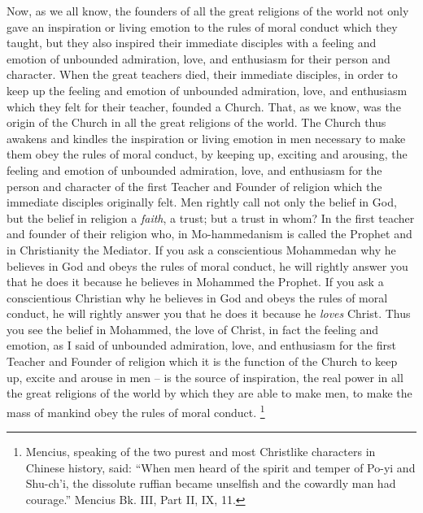 Now, as we all know, the founders of all the great religions of the world not only gave an inspiration or living emotion to the rules of moral conduct which they taught, but they also inspired their immediate disciples with a feeling and emotion of unbounded admiration, love, and enthusiasm for their person and character.
When the great teachers died, their immediate disciples, in order to keep up the feeling and emotion of unbounded admiration, love, and enthusiasm which they felt for their teacher, founded a Church.
That, as we know, was the origin of the Church in all the great religions of the world.
The Church thus awakens and kindles the inspiration or living emotion in men necessary to make them obey the rules of moral conduct, by keeping up, exciting and arousing, the feeling and emotion of unbounded admiration, love, and enthusiasm for the person and character of the first Teacher and Founder of religion which the immediate disciples originally felt.
Men rightly call not only the belief in God, but the belief in religion a \emph{faith}, a trust; but a trust in whom? In the first teacher and founder of their religion who, in Mo-hammedanism is called the Prophet and in Christianity the Mediator.
If you ask a conscientious Mohammedan why he believes in God and obeys the rules of moral conduct, he will rightly answer you that he does it because he believes in Mohammed the Prophet.
If you ask a conscientious Christian why he believes in God and obeys the rules of moral conduct, he will rightly answer you that he does it because he \emph{loves} Christ.
Thus you see the belief in Mohammed, the love of Christ, in fact the feeling and emotion,
as I said of unbounded admiration, love, and enthusiasm for the first Teacher and Founder of religion
which it is the function of the Church to keep up, excite and arouse in men
-- is the source of inspiration, the real power in all the great religions of the world by which they are able to make men, to make the mass of mankind obey the rules of moral conduct.
\footnote{Mencius, speaking of the two purest and most Christlike characters in Chinese history, said: ``When men heard of the spirit and temper of Po-yi and Shu-ch'i, the dissolute ruffian became unselfish and the cowardly man had courage.'' Mencius Bk. III, Part II, IX, 11.}

